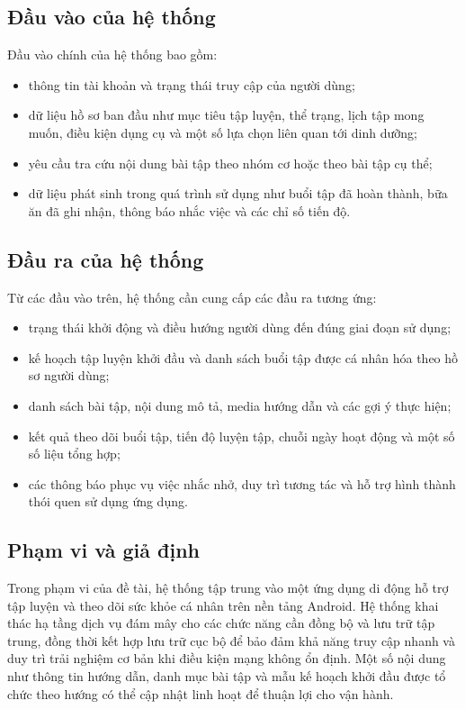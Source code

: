 \subsection{Đầu vào của hệ thống}

Đầu vào chính của hệ thống bao gồm:

\begin{itemize}
    \item thông tin tài khoản và trạng thái truy cập của người dùng;
    \item dữ liệu hồ sơ ban đầu như mục tiêu tập luyện, thể trạng, lịch tập mong muốn, điều kiện dụng cụ và một số lựa chọn liên quan tới dinh dưỡng;
    \item yêu cầu tra cứu nội dung bài tập theo nhóm cơ hoặc theo bài tập cụ thể;
    \item dữ liệu phát sinh trong quá trình sử dụng như buổi tập đã hoàn thành, bữa ăn đã ghi nhận, thông báo nhắc việc và các chỉ số tiến độ.
\end{itemize}

\subsection{Đầu ra của hệ thống}

Từ các đầu vào trên, hệ thống cần cung cấp các đầu ra tương ứng:

\begin{itemize}
    \item trạng thái khởi động và điều hướng người dùng đến đúng giai đoạn sử dụng;
    \item kế hoạch tập luyện khởi đầu và danh sách buổi tập được cá nhân hóa theo hồ sơ người dùng;
    \item danh sách bài tập, nội dung mô tả, media hướng dẫn và các gợi ý thực hiện;
    \item kết quả theo dõi buổi tập, tiến độ luyện tập, chuỗi ngày hoạt động và một số số liệu tổng hợp;
    \item các thông báo phục vụ việc nhắc nhở, duy trì tương tác và hỗ trợ hình thành thói quen sử dụng ứng dụng.
\end{itemize}

\subsection{Phạm vi và giả định}

Trong phạm vi của đề tài, hệ thống tập trung vào một ứng dụng di động hỗ trợ tập luyện và theo dõi sức khỏe cá nhân trên nền tảng Android. Hệ thống khai thác hạ tầng dịch vụ đám mây cho các chức năng cần đồng bộ và lưu trữ tập trung, đồng thời kết hợp lưu trữ cục bộ để bảo đảm khả năng truy cập nhanh và duy trì trải nghiệm cơ bản khi điều kiện mạng không ổn định. Một số nội dung như thông tin hướng dẫn, danh mục bài tập và mẫu kế hoạch khởi đầu được tổ chức theo hướng có thể cập nhật linh hoạt để thuận lợi cho vận hành.

